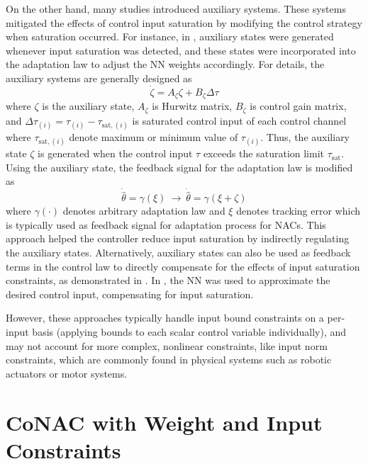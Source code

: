 On the other hand, many studies introduced auxiliary systems. These systems mitigated the effects of control input saturation by modifying the control strategy when saturation occurred. 
For instance, in \cite{RN60, RN95, RN46}, auxiliary states were generated whenever input saturation was detected, and these states were incorporated into the adaptation law to adjust the NN weights accordingly. 
For details, the auxiliary systems are generally designed as
\begin{equation}
    \dot\zeta = A_\zeta \zeta + B_\zeta \Delta\tau
\end{equation}
where $\zeta$ is the auxiliary state, $A_\zeta$ is Hurwitz matrix, $B_\zeta$ is control gain matrix, and $\Delta\tau_{(i)}=\tau_{(i)}-\tau_{\text{sat},(i)}$ is saturated control input of each control channel where $\tau_{\text{sat},(i)}$ denote maximum or minimum value of $\tau_{(i)}$.
Thus, the auxiliary state $\zeta$ is generated when the control input $\tau$ exceeds the saturation limit $\tau_{\text{sat}}$.
Using the auxiliary state, the feedback signal for the adaptation law is modified as
\begin{equation}
    \dot{\hat\theta} = \gamma(\xi) 
    \ \to \ 
    \dot{\hat\theta}=\gamma(\xi+\zeta)
\end{equation}
where $\gamma(\cdot)$ denotes arbitrary adaptation law and $\xi$ denotes tracking error which is typically used as feedback signal for adaptation process for NACs.  
This approach helped the controller reduce input saturation by indirectly regulating the auxiliary states.
Alternatively, auxiliary states can also be used as feedback terms in the control law to directly compensate for the effects of input saturation constraints, as demonstrated in \cite{RN89, RN88, RN82}. 
In \cite{RN18}, the NN was used to approximate the desired control input, compensating for input saturation. 

However, these approaches typically handle input bound constraints on a per-input basis (\ie applying bounds to each scalar control variable individually), and may not account for more complex, nonlinear constraints, like input norm constraints, which are commonly found in physical systems such as robotic actuators or motor systems.

\section{CoNAC with Weight and Input Constraints}


